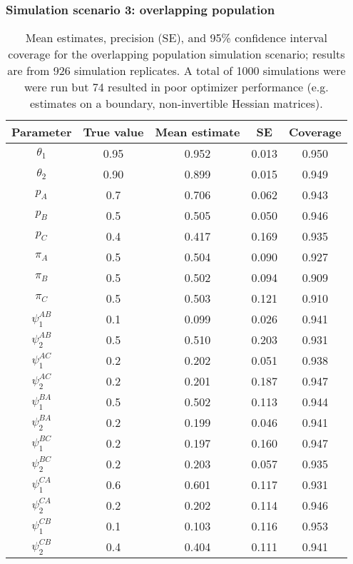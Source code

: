 \documentclass[times,mee,doublespace,]{besauth2}
\begin{document}
\begin{flushleft}
\subsubsection*{Simulation scenario 3: overlapping population}

\begin{table}[ht]
\caption{Mean estimates, precision (SE), and 95\% confidence interval coverage for the overlapping population simulation scenario; results are from 926 simulation replicates. A total of 1000 simulations were were run but 74 resulted in poor optimizer performance (e.g. estimates on a boundary, non-invertible Hessian matrices).}
\label{tab:partial}
\raggedright
\begin{tabular}{ccccc}
  \hline
  Parameter & True value & Mean estimate & SE & Coverage \\
  \hline
 $\theta_1$ & 0.95 & 0.952 & 0.013 & 0.950 \\
 $\theta_2$ & 0.90 & 0.899 & 0.015 & 0.949 \\
 $p_A$ & 0.7 & 0.706 & 0.062 & 0.943 \\
 $p_B$ & 0.5 & 0.505 & 0.050 &  0.946 \\
 $p_C$ & 0.4 & 0.417 & 0.169 & 0.935 \\
 $\pi_A$  & 0.5 & 0.504 & 0.090 & 0.927 \\
 $\pi_B$  & 0.5 & 0.502 & 0.094 & 0.909 \\
 $\pi_C$  & 0.5 & 0.503 & 0.121 & 0.910 \\
 $\psi_1^{AB}$ & 0.1 & 0.099  & 0.026 & 0.941 \\
 $\psi_2^{AB}$ & 0.5 & 0.510 & 0.203 & 0.931 \\
 $\psi_1^{AC}$ & 0.2 & 0.202 & 0.051 & 0.938 \\
 $\psi_2^{AC}$ & 0.2 & 0.201 & 0.187 & 0.947 \\
 $\psi_1^{BA}$ & 0.5 & 0.502 & 0.113 & 0.944 \\
 $\psi_2^{BA}$ & 0.2 & 0.199 & 0.046 & 0.941 \\
 $\psi_1^{BC}$ & 0.2 & 0.197 & 0.160 & 0.947 \\
 $\psi_2^{BC}$ & 0.2 & 0.203 & 0.057 & 0.935 \\
 $\psi_1^{CA}$ & 0.6 & 0.601 & 0.117 & 0.931 \\
 $\psi_2^{CA}$ & 0.2 & 0.202 & 0.114 & 0.946 \\
 $\psi_1^{CB}$ & 0.1 & 0.103 & 0.116 & 0.953 \\
 $\psi_2^{CB}$ & 0.4 & 0.404 & 0.111 & 0.941 \\
 \hline
\end{tabular}
\\
\end{table}





\pagebreak


\end{flushleft}
\end{document}
